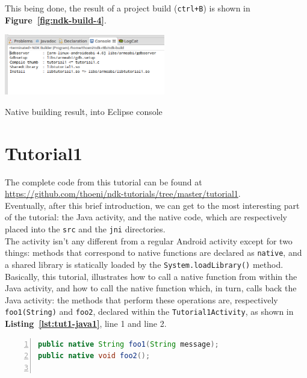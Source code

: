 \documentclass[a4paper,10pt]{article}
\makeatletter
\newenvironment{figurehere}{\def\@captype{figure}\vspace{2ex}}{\vspace{2ex}}
\newcommand{\keyword}[1]{\texttt{#1}}
\newcommand{\reff}[1]{\textbf{Figure~\ref{#1}}}
\newcommand{\refl}[1]{\textbf{Listing~\ref{#1}}}
\makeatother
\begin{document}
\begin{multicols}{2}
This being done, the result of a project build (\texttt{ctrl+B}) is shown in \reff{fig:ndk-build-4}.

\begin{figurehere}
 \centering
 \includegraphics[width=7cm]{./figures/ndk-build-4.png}
 \caption{Native building result, into Eclipse console}
 \label{fig:ndk-build-4}
\end{figurehere}


\section{Tutorial1}
\label{sec:tutorial1}
The complete code from this tutorial can be found at \url{https://github.com/thoeni/ndk-tutorials/tree/master/tutorial1}.\\
Eventually, after this brief introduction, we can get to the most interesting part of the tutorial: the Java activity, and the native code, which are respectively placed into the \keyword{src} and the \keyword{jni} directories.\\
The activity isn't any different from a regular Android activity except for two things: methods that correspond to native functions are declared as \keyword{native}, and a shared library is statically loaded by the \keyword{System.loadLibrary()} method.\\
Basically, this tutorial, illustrates how to call a native function from within the Java activity, and how to call the native function which, in turn, calls back the Java activity: the methods that perform these operations are, respectively \keyword{foo1(String)} and \keyword{foo2}, declared within the \keyword{Tutorial1Activity}, as shown in \refl{lst:tut1-java1}, line 1 and line 2.

\begin{lstlisting}[language=Java,
				   columns=fullflexible,
				   showstringspaces=false,
				   xleftmargin=15pt,
				   frame = l,
				   numbers=left,
				   commentstyle=\color{gray}\upshape,
				   caption=Part of Tutorial1Activity.java,
				   label=lst:tut1-java1]
public native String foo1(String message);
public native void foo2();
  

\end{lstlisting}
\end{multicols}
\end{document}
